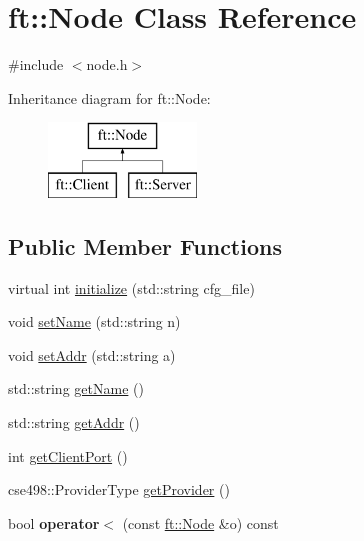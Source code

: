 \hypertarget{classft_1_1Node}{}\section{ft\+:\+:Node Class Reference}
\label{classft_1_1Node}


{\ttfamily \#include $<$node.\+h$>$}

Inheritance diagram for ft\+:\+:Node\+:\begin{figure}[H]
\begin{center}
\leavevmode
\includegraphics[height=2.000000cm]{classft_1_1Node}
\end{center}
\end{figure}
\subsection*{Public Member Functions}
\begin{DoxyCompactItemize}
\item 
virtual int \mbox{\hyperlink{classft_1_1Node_addc92fd2c5cae12a8ea68c30b7202e91}{initialize}} (std\+::string cfg\+\_\+file)
\item 
void \mbox{\hyperlink{classft_1_1Node_a0a09f86d4b043b0da034e7da0d83463c}{set\+Name}} (std\+::string n)
\item 
void \mbox{\hyperlink{classft_1_1Node_af2fde6292b45c9a7e85a8905c8c728cc}{set\+Addr}} (std\+::string a)
\item 
std\+::string \mbox{\hyperlink{classft_1_1Node_af62312cc4d5a05c859034b10b1a1af64}{get\+Name}} ()
\item 
std\+::string \mbox{\hyperlink{classft_1_1Node_aabbf4a7cd8fcea779622b65a4bf75e94}{get\+Addr}} ()
\item 
int \mbox{\hyperlink{classft_1_1Node_ad936b7c83c1169f04fe5c73ccca2a99d}{get\+Client\+Port}} ()
\item 
cse498\+::\+Provider\+Type \mbox{\hyperlink{classft_1_1Node_ae6115aceb38ad07ba4afd6fa7cd7f9aa}{get\+Provider}} ()
\item 
\mbox{\label{classft_1_1Node_a01c39aea51e51007be97a4a18c05d938}} 
bool {\bfseries operator$<$} (const \mbox{\hyperlink{classft_1_1Node}{ft\+::\+Node}} \&o) const
\end{DoxyCompactItemize}
